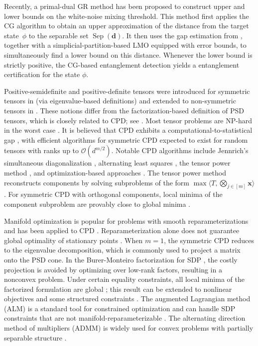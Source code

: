 \documentclass[smallextended]{svjour3}
\DeclareMathOperator{\sep}{Sep}
\newcommand{\1}{\mathbf{1}}
\newcommand{\x}{\mathbf{x}}
\newcommand{\NPh}{\textsf{NP}-hard}
\DeclareMathOperator{\bmtens}{\bigotimes}
\newcommand{\inner}[2]{\langle #1, #2 \rangle}
\newcommand{\vc}[1]{\mathbf{#1}}
\newcommand{\vd}{\vc{d}}
\begin{document}
Recently, a primal-dual GR method has been proposed \cite{liu2025unified} to construct upper and lower bounds on the white-noise mixing threshold. This method first applies the CG algorithm to obtain an upper approximation of the distance from the target state~$\phi$ to the separable set $\sep(\vd)$. It then uses the gap estimation from \cite{thuerck2023learning}, together with a simplicial-partition-based LMO equipped with error bounds, to simultaneously find a lower bound on this distance. Whenever the lower bound is strictly positive, the CG-based entanglement detection yields a entanglement certification for the state $\phi$.

Positive-semidefinite and positive-definite tensors were introduced for symmetric tensors in \cite{qi2013symmetric} (via eigenvalue-based definitions) and extended to non-symmetric tensors in \cite{hu2013determinants}. These notions differ from the factorization-based definition of PSD tensors, which is closely related to CPD; see \cite{hitchcock1927expression,hitchcock1928multiple,kolda2009tensor}. Most tensor problems are \NPh{} in the worst case \cite{hillar2013}. It is believed that CPD exhibits a computational-to-statistical gap \cite{bandeira2018}, with efficient algorithms for symmetric CPD expected to exist for random tensors with ranks up to $\mathcal{O}(d^{m/2})$. Notable CPD algorithms include Jennrich's simultaneous diagonalization \cite{de2004computation,leurgans1993decomposition}, alternating least squares \cite{leurgans1993decomposition}, the tensor power method \cite{de2000best}, and optimization-based approaches \cite{sorber2013optimization}. The tensor power method reconstructs components by solving subproblems of the form \(\max\inner{T}{\bmtens_{j\in[m]}\x}\). For symmetric CPD with orthogonal components, local minima of the component subproblem are provably close to global minima \cite{ge2015escaping}.

Manifold optimization \cite{absil2009optimization,boumal2023introduction} is popular for problems with smooth reparameterizations and has been applied to CPD \cite{breiding2018riemannian,dong2022new}.  Reparameterization alone does not guarantee global optimality of stationary points \cite{levin2025effect}. When
$m=1$, the symmetric CPD reduces to the eigenvalue decomposition, which is commonly used to project a matrix onto the PSD cone. In the Burer-Monteiro factorization for SDP \cite{burer2003nonlinear}, the costly projection is avoided by optimizing over low-rank factors, resulting in a nonconvex problem. Under certain equality constraints, all local minima of the factorized formulation are global \cite{burer2005local}; this result can be extended to nonlinear objectives and some structured constraints \cite{journee2010low}. The augmented Lagrangian method (ALM) is a standard tool for constrained optimization \cite{bertsekas2014constrained} and can handle SDP constraints that are not manifold-reparameterizable \cite{dong2022new,wang2023decomposition,wang2025solving}. The alternating direction method of multipliers (ADMM) is widely used for convex problems with partially separable structure \cite{boyd2011distributed}.
\end{document}
